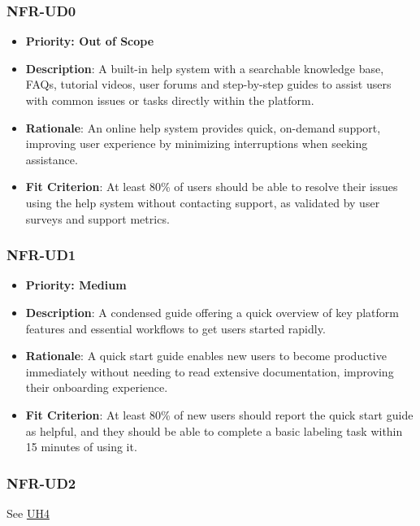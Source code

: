 \documentclass[12pt]{article}
\begin{document}
        \subsubsection*{NFR-UD0} 
        \label{sec:UD0}
        \begin{itemize} 
          \item \textbf{Priority: Out of Scope}
            \item \textbf{Description}: A built-in help system with a searchable knowledge base, FAQs, tutorial videos, user forums and step-by-step guides to assist users with common issues or tasks directly within the platform.  
            \item \textbf{Rationale}: An online help system provides quick, on-demand support, improving user experience by minimizing interruptions when seeking assistance.  
            \item \textbf{Fit Criterion}: At least 80\% of users should be able to resolve their issues using the help system without contacting support, as validated by user surveys and support metrics.
        \end{itemize}
        \subsubsection*{NFR-UD1}
        \label{sec:UD1}
        \begin{itemize} 
          \item \textbf{Priority: Medium}
            \item \textbf{Description}: A condensed guide offering a quick overview of key platform features and essential workflows to get users started rapidly.  
            \item \textbf{Rationale}: A quick start guide enables new users to become productive immediately without needing to read extensive documentation, improving their onboarding experience.  
            \item \textbf{Fit Criterion}: At least 80\% of new users should report the quick start guide as helpful, and they should be able to complete a basic labeling task within 15 minutes of using it.
        \end{itemize}
        \subsubsection*{NFR-UD2}
        \label{sec:UD2}
        See \hyperref[sec:UH4]{UH4}
        
\end{document}
